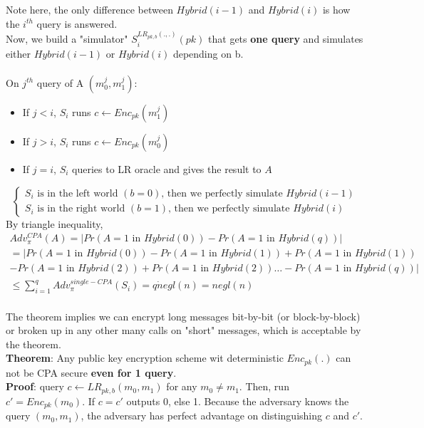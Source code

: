 \documentclass{scribe}
\begin{document}
\noindent Note here, the only difference between $Hybrid(i-1)$ and $Hybrid(i)$ is how the $i^{th}$ query is answered. 
\\
Now, we build a "simulator" $S_i^{LR_{pk,b}(.,.)}(pk)$ that gets \textbf{one query} and simulates either $Hybrid(i-1)$ or $Hybrid(i)$ depending on b.
\\
\\
On $j^{th}$ query of A $(m_0^j,m_1^j)$:
\begin{itemize}
    \item If $j<i$, $S_i$ runs $c \leftarrow Enc_{pk}(m_1^j)$
    \item If $j>i$, $S_i$ runs $c \leftarrow Enc_{pk}(m_0^j)$
    \item If $j=i$, $S_i$ queries to LR oracle and gives the result to $A$
\end{itemize}
\begin{equation}
\begin{cases}
    S_i\text{ is in the left world }(b=0)\text{, then we perfectly simulate }Hybrid(i-1) \\
    S_i\text{ is in the right world }(b=1)\text{, then we perfectly simulate }Hybrid(i)
\end{cases}
\end{equation}
By triangle inequality,
\begin{multline*}
Adv_{\pi}^{CPA}(A) = \big|Pr(A=1\text{ in } Hybrid(0)) - Pr(A=1\text{ in } Hybrid(q)) \big|\\
= \big|Pr(A=1\text{ in } Hybrid(0)) - Pr(A=1\text{ in } Hybrid(1)) + Pr(A=1\text{ in } Hybrid(1)) \\
-Pr(A=1\text{ in } Hybrid(2)) + Pr(A=1\text{ in } Hybrid(2)) \dots -Pr(A=1\text{ in } Hybrid(q)) \big|\\
\le \sum_{i=1}^{q} Adv_{\pi}^{single-CPA}(S_i) = q \dot negl(n) = negl(n)
\end{multline*}
\\
The theorem implies we can encrypt long messages bit-by-bit (or block-by-block) or broken up in any other many calls on "short" messages, which is acceptable by the theorem.
\vspace{5mm}
\\
\textbf{Theorem}: Any public key encryption scheme wit deterministic $Enc_{pk}(.)$ can not be CPA secure \textbf{even for 1 query}.
\\
\textbf{Proof}: query $c \leftarrow LR_{pk,b}(m_0,m_1)$ for any $m_0 \neq m_1$. Then, run $c' = Enc_{pk}(m_0)$. If $c=c'$ outputs 0, else 1. Because the adversary knows the query $(m_0,m_1)$, the adversary has perfect advantage on distinguishing $c$ and $c'$.
\end{document}
